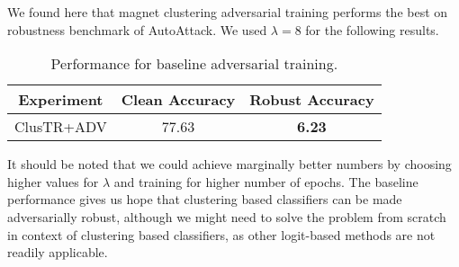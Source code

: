 We found here that magnet clustering adversarial training performs the best on robustness benchmark of AutoAttack. We used $\lambda=8$ for the following results.
\begin{table}[h!]
    \centering
    \begin{tabular}{|c|c|c|}
    \hline
        \textbf{Experiment} & \textbf{Clean Accuracy} & \textbf{Robust Accuracy} \\
        \hline
        ClusTR+ADV & 77.63 & \textbf{6.23} \\
        \hline
     \end{tabular}
    \caption{Performance for baseline adversarial training.}
    \label{tab:adv}
\end{table}

It should be noted that we could achieve marginally better numbers by choosing higher values for $\lambda$ and training for higher number of epochs. The baseline performance gives us hope that clustering based classifiers can be made adversarially robust, although we might need to solve the problem from scratch in context of clustering based classifiers, as other logit-based methods are not readily applicable.

